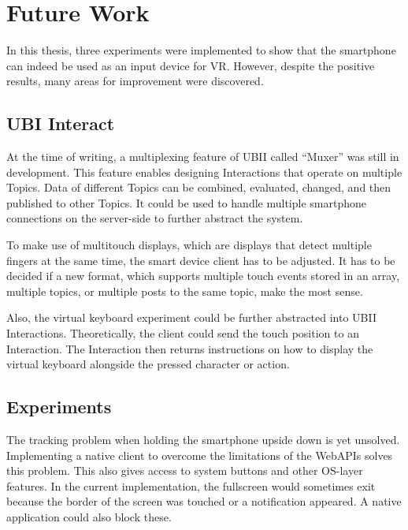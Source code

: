 \chapter{Future Work}\label{chapter:future-work}

In this thesis, three experiments were implemented to show that the smartphone can indeed be used as an input device for \gls{VR}. However, despite the positive results, many areas for improvement were discovered. %


\section{UBI Interact}\label{section:fw-ubii}

At the time of writing, a multiplexing feature of \gls{UBII} called \enquote{Muxer} was still in development. This feature enables designing Interactions that operate on multiple Topics. Data of different Topics can be combined, evaluated, changed, and then published to other Topics. It could be used to handle multiple smartphone connections on the server-side to further abstract the system.

To make use of multitouch displays, which are displays that detect multiple fingers at the same time, the smart device client has to be adjusted. It has to be decided if a new format, which supports multiple touch events stored in an array, multiple topics, or multiple posts to the same topic, make the most sense.

Also, the virtual keyboard experiment could be further abstracted into \gls{UBII} Interactions. Theoretically, the client could send the touch position to an Interaction. The Interaction then returns instructions on how to display the virtual keyboard alongside the pressed character or action.


\section{Experiments}\label{section:fw-experiments}

The tracking problem when holding the smartphone upside down is yet unsolved. Implementing a native client to overcome the limitations of the Web\glspl{API} solves this problem. This also gives access to system buttons and other \gls{OS}-layer features. In the current implementation, the fullscreen would sometimes exit because the border of the screen was touched or a notification appeared. A native application could also block these.

